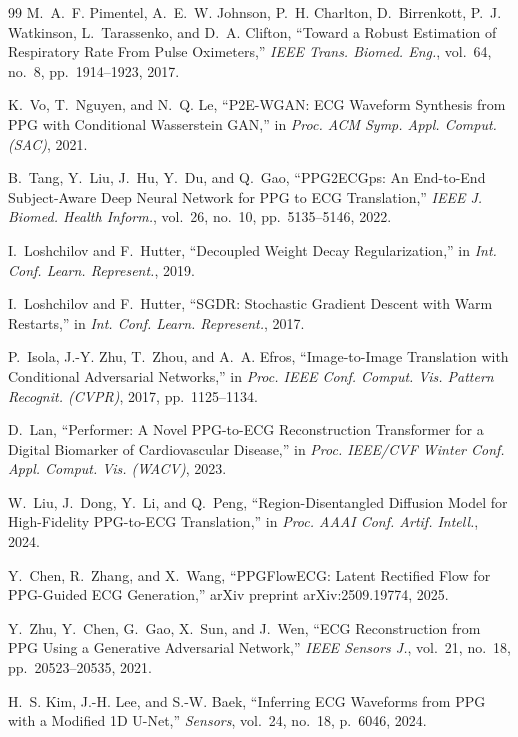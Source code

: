 \documentclass[11pt,a4paper]{article}
\begin{document}
\begin{thebibliography}{99}
M.~A.~F. Pimentel, A.~E.~W. Johnson, P.~H. Charlton, D.~Birrenkott, P.~J. Watkinson, L.~Tarassenko, and D.~A. Clifton,
``Toward a Robust Estimation of Respiratory Rate From Pulse Oximeters,''
\textit{IEEE Trans. Biomed. Eng.}, vol.~64, no.~8, pp.~1914--1923, 2017.

K.~Vo, T.~Nguyen, and N.~Q. Le,
``P2E-WGAN: ECG Waveform Synthesis from PPG with Conditional Wasserstein GAN,''
in \textit{Proc. ACM Symp. Appl. Comput. (SAC)}, 2021.

B.~Tang, Y.~Liu, J.~Hu, Y.~Du, and Q.~Gao,
``PPG2ECGps: An End-to-End Subject-Aware Deep Neural Network for PPG to ECG Translation,''
\textit{IEEE J. Biomed. Health Inform.}, vol.~26, no.~10, pp.~5135--5146, 2022.

I.~Loshchilov and F.~Hutter,
``Decoupled Weight Decay Regularization,''
in \textit{Int. Conf. Learn. Represent.}, 2019.

I.~Loshchilov and F.~Hutter,
``SGDR: Stochastic Gradient Descent with Warm Restarts,''
in \textit{Int. Conf. Learn. Represent.}, 2017.

P.~Isola, J.-Y. Zhu, T.~Zhou, and A.~A. Efros,
``Image-to-Image Translation with Conditional Adversarial Networks,''
in \textit{Proc. IEEE Conf. Comput. Vis. Pattern Recognit. (CVPR)}, 2017, pp.~1125--1134.

D.~Lan,
``Performer: A Novel PPG-to-ECG Reconstruction Transformer for a Digital Biomarker of Cardiovascular Disease,''
in \textit{Proc. IEEE/CVF Winter Conf. Appl. Comput. Vis. (WACV)}, 2023.

W.~Liu, J.~Dong, Y.~Li, and Q.~Peng,
``Region-Disentangled Diffusion Model for High-Fidelity PPG-to-ECG Translation,''
in \textit{Proc. AAAI Conf. Artif. Intell.}, 2024.

Y.~Chen, R.~Zhang, and X.~Wang,
``PPGFlowECG: Latent Rectified Flow for PPG-Guided ECG Generation,''
arXiv preprint arXiv:2509.19774, 2025.

Y.~Zhu, Y.~Chen, G.~Gao, X.~Sun, and J.~Wen,
``ECG Reconstruction from PPG Using a Generative Adversarial Network,''
\textit{IEEE Sensors J.}, vol.~21, no.~18, pp.~20523--20535, 2021.

H.~S. Kim, J.-H. Lee, and S.-W. Baek,
``Inferring ECG Waveforms from PPG with a Modified 1D U-Net,''
\textit{Sensors}, vol.~24, no.~18, p.~6046, 2024.


\end{thebibliography}
\end{document}
